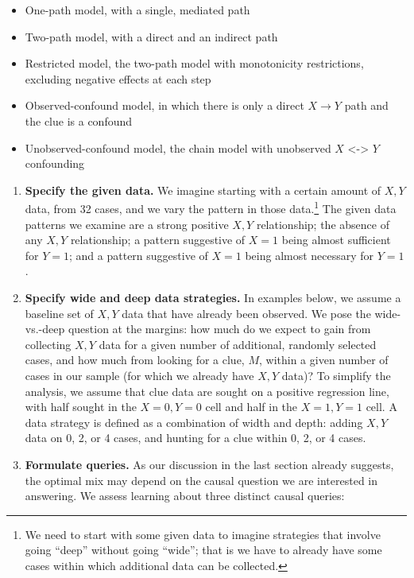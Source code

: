 \documentclass[
  12pt,
]{book}
\providecommand{\tightlist}{%
  \setlength{\itemsep}{0pt}\setlength{\parskip}{0pt}}
\begin{document}
\begin{itemize}
\tightlist
\item
  One-path model, with a single, mediated path
\item
  Two-path model, with a direct and an indirect path
\item
  Restricted model, the two-path model with monotonicity restrictions, excluding negative effects at each step
\item
  Observed-confound model, in which there is only a direct \(X \rightarrow Y\) path and the clue is a confound
\item
  Unobserved-confound model, the chain model with unobserved \(X\) \textless-\textgreater{} \(Y\) confounding
\end{itemize}

\begin{enumerate}
\def\labelenumi{\arabic{enumi}.}
\setcounter{enumi}{1}
\item
  \textbf{Specify the given data.} We imagine starting with a certain amount of \(X,Y\) data, from 32 cases, and we vary the pattern in those data.\footnote{We need to start with some given data to imagine strategies that involve going ``deep'' without going ``wide''; that is we have to already have some cases within which additional data can be collected.} The given data patterns we examine are a strong positive \(X,Y\) relationship; the absence of any \(X,Y\) relationship; a pattern suggestive of \(X=1\) being almost sufficient for \(Y=1\); and a pattern suggestive of \(X=1\) being almost necessary for \(Y=1\).
\item
  \textbf{Specify wide and deep data strategies.} In examples below, we assume a baseline set of \(X, Y\) data that have already been observed. We pose the wide-vs.-deep question at the margins: how much do we expect to gain from collecting \(X,Y\) data for a given number of additional, randomly selected cases, and how much from looking for a clue, \(M\), within a given number of cases in our sample (for which we already have \(X,Y\) data)? To simplify the analysis, we assume that clue data are sought on a positive regression line, with half sought in the \(X=0, Y=0\) cell and half in the \(X=1, Y=1\) cell. A data strategy is defined as a combination of width and depth: adding \(X,Y\) data on 0, 2, or 4 cases, and hunting for a clue within 0, 2, or 4 cases.
\item
  \textbf{Formulate queries.} As our discussion in the last section already suggests, the optimal mix may depend on the causal question we are interested in answering. We assess learning about three distinct causal queries:
\end{enumerate}
\end{document}

